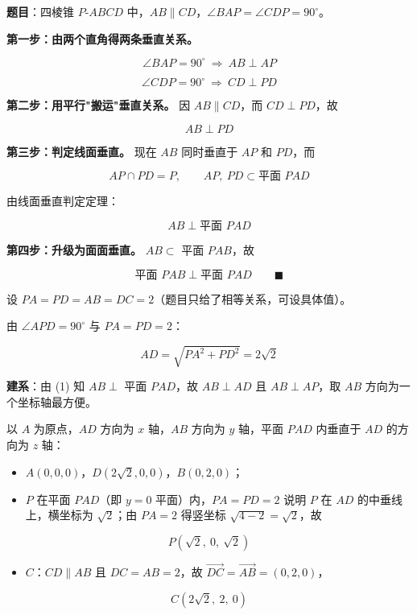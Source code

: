 \par\medskip


\textbf{题目}：四棱锥 $P\text{-}ABCD$ 中，$AB\parallel CD$，$\angle BAP=\angle CDP=90^\circ$。

\begin{center}\end{center}


\textbf{第一步：由两个直角得两条垂直关系。}

\[\angle BAP=90^\circ\ \Longrightarrow\ AB\perp AP\]

\[\angle CDP=90^\circ\ \Longrightarrow\ CD\perp PD\]

\textbf{第二步：用平行"搬运"垂直关系。} 因 $AB\parallel CD$，而 $CD\perp PD$，故

\[AB\perp PD\]

\textbf{第三步：判定线面垂直。} 现在 $AB$ 同时垂直于 $AP$ 和 $PD$，而

\[AP\cap PD=P,\qquad AP,\ PD\subset\text{平面 }PAD\]

由线面垂直判定定理：

\[AB\perp\text{平面 }PAD\]

\textbf{第四步：升级为面面垂直。} $AB\subset$ 平面 $PAB$，故

\[\text{平面 }PAB\perp\text{平面 }PAD\qquad\blacksquare\]


设 $PA=PD=AB=DC=2$（题目只给了相等关系，可设具体值）。

由 $\angle APD=90^\circ$ 与 $PA=PD=2$：

\[AD=\sqrt{PA^{2}+PD^{2}}=2\sqrt2\]

\textbf{建系}：由 (1) 知 $AB\perp$ 平面 $PAD$，故 $AB\perp AD$ 且 $AB\perp AP$，取 $AB$ 方向为一个坐标轴最方便。

以 $A$ 为原点，$AD$ 方向为 $x$ 轴，$AB$ 方向为 $y$ 轴，平面 $PAD$ 内垂直于 $AD$ 的方向为 $z$ 轴：

\begin{itemize}
\item $A(0,0,0)$，$D\left(2\sqrt2,0,0\right)$，$B(0,2,0)$；
\item $P$ 在平面 $PAD$（即 $y=0$ 平面）内，$PA=PD=2$ 说明 $P$ 在 $AD$ 的中垂线上，横坐标为 $\sqrt2$；由 $PA=2$ 得竖坐标 $\sqrt{4-2}=\sqrt2$，故
\end{itemize}
\[P\left(\sqrt2,\ 0,\ \sqrt2\right)\]
\begin{itemize}
\item $C$：$CD\parallel AB$ 且 $DC=AB=2$，故 $\overrightarrow{DC}=\overrightarrow{AB}=(0,2,0)$，
\end{itemize}
\[C\left(2\sqrt2,\ 2,\ 0\right)\]

